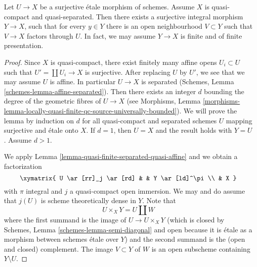 \begin{lemma}
\label{lemma-there-is-a-scheme-integral-over}
Let $U \to X$ be a surjective \'etale morphism of schemes. Assume $X$
is quasi-compact and quasi-separated. Then there exists a surjective
integral morphism $Y \to X$, such that for
every $y \in Y$ there is an open neighbourhood $V \subset Y$
such that $V \to X$ factors through $U$. In fact, we may assume
$Y \to X$ is finite and of finite presentation.
\end{lemma}

\begin{proof}
Since $X$ is quasi-compact, there exist finitely many affine opens
$U_i \subset U$ such that $U' = \coprod U_i \to X$ is surjective.
After replacing $U$ by $U'$, we see that we may assume $U$ is affine.
In particular $U \to X$ is separated
(Schemes, Lemma \ref{schemes-lemma-affine-separated}).
Then there exists an integer $d$ bounding the degree of the geometric
fibres of $U \to X$ (see Morphisms, Lemma
\ref{morphisms-lemma-locally-quasi-finite-qc-source-universally-bounded}).
We will prove the lemma by induction on $d$ for all quasi-compact
and separated schemes $U$ mapping surjective and \'etale onto $X$.
If $d = 1$, then $U = X$ and the result holds with $Y = U$.
Assume $d > 1$.

\medskip\noindent
We apply Lemma \ref{lemma-quasi-finite-separated-quasi-affine}
and we obtain a factorization
$$
\xymatrix{
U \ar[rr]_j \ar[rd] & & Y \ar[ld]^\pi \\
& X
}
$$
with $\pi$ integral and $j$ a quasi-compact open immersion. We may and do
assume that $j(U)$ is scheme theoretically dense in $Y$. Note that
$$
U \times_X Y = U \amalg W
$$
where the first summand is the image of $U \to U \times_X Y$
(which is closed by
Schemes, Lemma \ref{schemes-lemma-semi-diagonal}
and open because it is \'etale as a morphism between schemes \'etale over $Y$)
and the second summand is the (open and closed) complement.
The image $V \subset Y$ of $W$ is an open subscheme containing
$Y \setminus U$.


\end{proof}
